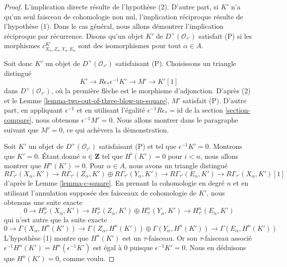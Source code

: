 \begin{proof}
L'implication directe résulte de l'hypothèse (2). D'autre part, si $K'$
n'a qu'un seul faisceau de cohomologie non nul, l'implication réciproque
résulte de l'hypothèse (1). Dans le cas général, nous allons démontrer
l'implication réciproque par récurrence. Disons qu'un objet $K'$ de
$D^+(\mathcal{O}_{\tau'})$ satisfait (P) si les morphismes
$c^{K'}_{X_\alpha, Z_\alpha, Y_\alpha, E_\alpha}$ sont des isomorphismes
pour tout $\alpha \in A$.

\medskip\noindent
Soit donc $K'$ un objet de $D^+(\mathcal{O}_{\tau'})$ satisfaisant (P).
Choisissons un triangle distingué
$$
K' \to R\epsilon_*\epsilon^{-1}K' \to M' \to K'[1]
$$
dans $D^+(\mathcal{O}_{\tau'})$, où la première flèche est le morphisme
d'adjonction. D'après (2) et le Lemme
\ref{lemma-two-out-of-three-blow-up-square}, $M'$ satisfait (P). D'autre
part, en appliquant $\epsilon^{-1}$ et en utilisant l'égalité
$\epsilon^{-1}R\epsilon_* = \text{id}$ de la section
\ref{section-compare}, nous obtenons $\epsilon^{-1}M' = 0$. Nous allons
montrer dans le paragraphe suivant que $M' = 0$, ce qui achèvera la
démonstration.

\medskip\noindent
Soit $K'$ un objet de $D^+(\mathcal{O}_{\tau'})$ satisfaisant (P) et tel
que $\epsilon^{-1}K' = 0$. Montrons que $K' = 0$. Étant donné
$n \in \mathbf{Z}$ tel que $H^i(K') = 0$ pour $i < n$, nous allons montrer
que $H^n(K') = 0$. Pour $\alpha \in A$, nous avons un triangle distingué
$$
R\Gamma_{\tau'}(X_\alpha, K') \to
R\Gamma_{\tau'}(Z_\alpha, K') \oplus
R\Gamma_{\tau'}(Y_\alpha, K') \to
R\Gamma_{\tau'}(E_\alpha, K') \to
R\Gamma_{\tau'}(X_\alpha, K')[1]
$$
d'après le Lemme \ref{lemma-c-square}. En prenant la cohomologie en degré
$n$ et en utilisant l'annulation supposée des faisceaux de cohomologie de
$K'$, nous obtenons une suite exacte
$$
0 \to
H^n_{\tau'}(X_\alpha, K') \to
H^n_{\tau'}(Z_\alpha, K') \oplus
H^n_{\tau'}(Y_\alpha, K') \to
H^n_{\tau'}(E_\alpha, K')
$$
qui n'est autre que la suite exacte
$$
0 \to
\Gamma(X_\alpha, H^n(K')) \to
\Gamma(Z_\alpha, H^n(K')) \oplus
\Gamma(Y_\alpha, H^n(K')) \to
\Gamma(E_\alpha, H^n(K'))
$$
L'hypothèse (1) montre que $H^n(K')$ est un $\tau$-faisceau. Or son
$\tau$-faisceau associé
$\epsilon^{-1}H^n(K') = H^n(\epsilon^{-1}K')$ est égal à $0$ puisque
$\epsilon^{-1}K' = 0$. Nous en déduisons que $H^n(K') = 0$, comme voulu.
\end{proof}


